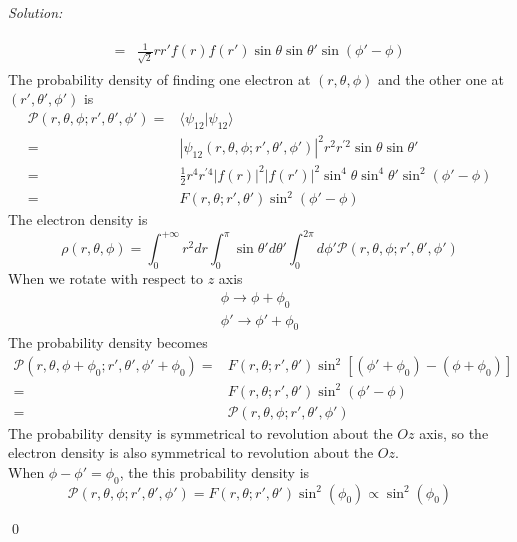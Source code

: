 \documentclass[10pt,a4paper]{article}
\newenvironment{sol}
    {\emph{Solution:}
    }
    {
    \qed
    }
\begin{document}
\begin{sol}
\begin{itemize}
\begin{gather}
\begin{align}
=&\frac{1}{\sqrt{2}}rr'f(r)f(r')\sin\theta\sin\theta'\sin(\phi'-\phi)
\end{align}
\end{gather}
The probability density of finding one electron at $(r,\theta,\phi)$ and the other one at $(r',\theta',\phi')$ is
\begin{align}
\nonumber\mathscr{P}(r,\theta,\phi;r',\theta',\phi')=&\langle\psi_{12}|\psi_{12}\rangle\\
\nonumber=&|\psi_{12}(r,\theta,\phi;r',\theta',\phi')|^2r^2r^{'2}\sin\theta\sin\theta'\\
\nonumber=&\frac{1}{2}r^4r^{'4}|f(r)|^2|f(r')|^2\sin^4\theta\sin^4\theta'\sin^2(\phi'-\phi)\\
=&F(r,\theta;r',\theta')\sin^2(\phi'-\phi)
\end{align}
The electron density is
\begin{equation}
\rho(r,\theta,\phi)=\int_0^{+\infty}r^2dr\int_0^{\pi}\sin\theta'd\theta'\int_0^{2\pi}d\phi'\mathscr{P}(r,\theta,\phi;r',\theta',\phi')
\end{equation}
When we rotate with respect to $z$ axis
\begin{gather}
\phi\rightarrow\phi+\phi_0\\
\phi'\rightarrow\phi'+\phi_0
\end{gather}
The probability density becomes
\begin{align}
\nonumber\mathscr{P}(r,\theta,\phi+\phi_0;r',\theta',\phi'+\phi_0)=&F(r,\theta;r',\theta')\sin^2[(\phi'+\phi_0)-(\phi+\phi_0)]\\
\nonumber=&F(r,\theta;r',\theta')\sin^2(\phi'-\phi)\\
=&\mathscr{P}(r,\theta,\phi;r',\theta',\phi')
\end{align}
The probability density is symmetrical to revolution about the $Oz$ axis, so the electron density is also symmetrical to revolution about the $Oz$.\\
When $\phi-\phi'=\phi_0$, the this probability density is
\begin{equation}
\mathscr{P}(r,\theta,\phi;r',\theta',\phi')=F(r,\theta;r',\theta')\sin^2(\phi_0)\propto\sin^2(\phi_0)
\end{equation}
\end{itemize}
\end{sol}
\end{document}
